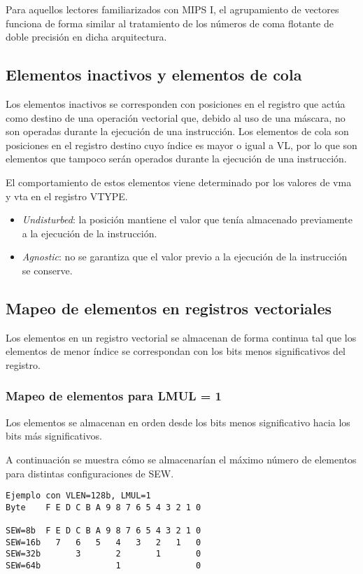 Para aquellos lectores familiarizados con MIPS I, el agrupamiento de vectores funciona de forma similar al tratamiento de los números de coma flotante de doble precisión en dicha arquitectura.


\subsection{Elementos inactivos y elementos de cola}\label{masked-and-tail-elements}
Los elementos inactivos se corresponden con posiciones en el registro que actúa como destino de una operación vectorial que, debido al uso de una máscara, no son operadas durante la ejecución de una instrucción. Los elementos de cola son posiciones en el registro destino cuyo índice es mayor o igual a VL, por lo que son elementos que tampoco serán operados durante la ejecución de una instrucción.

El comportamiento de estos elementos viene determinado por los valores de vma y vta en el registro VTYPE.
\begin{itemize}
    \item \textit{Undisturbed}: la posición mantiene el valor que tenía almacenado previamente a la ejecución de la instrucción.
    \item \textit{Agnostic}: no se garantiza que el valor previo a la ejecución de la instrucción se conserve.
\end{itemize}

\subsection{Mapeo de elementos en registros vectoriales}\label{subsec:mapping-vector-elements}

Los elementos en un registro vectorial se almacenan de forma continua tal que
los elementos de menor índice se correspondan con los bits menos significativos
del registro.

\subsubsection{Mapeo de elementos para LMUL = 1}
Los elementos se almacenan en orden desde los bits menos significativo hacia
los bits más significativos.

A continuación se muestra cómo se almacenarían el máximo número de elementos
para distintas configuraciones de SEW.

\begin{lstlisting}
Ejemplo con VLEN=128b, LMUL=1
Byte    F E D C B A 9 8 7 6 5 4 3 2 1 0

SEW=8b  F E D C B A 9 8 7 6 5 4 3 2 1 0
SEW=16b   7   6   5   4   3   2   1   0
SEW=32b       3       2       1       0
SEW=64b               1               0
\end{lstlisting}

